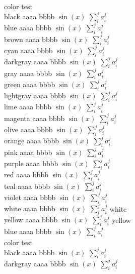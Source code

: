 \documentclass[amsfonts,aps, prl,nofootinbib, twocolumn,showpacs, showkeys,longbibliography]{revtex4-1}
\begin{document}
color test\\
{\color{black} black aaaa bbbb $\sin(x)$ $\sum_{i}^{j} a_{i}^{j}$}\\
{\color{blue} blue aaaa bbbb $\sin(x)$ $\sum_{i}^{j} a_{i}^{j}$}\\
{\color{brown} brown aaaa bbbb $\sin(x)$ $\sum_{i}^{j} a_{i}^{j}$}\\
{\color{cyan} cyan aaaa bbbb $\sin(x)$ $\sum_{i}^{j} a_{i}^{j}$}\\
{\color{darkgray} darkgray aaaa bbbb $\sin(x)$ $\sum_{i}^{j} a_{i}^{j}$}\\
{\color{gray} gray aaaa bbbb $\sin(x)$ $\sum_{i}^{j} a_{i}^{j}$}\\
{\color{green} green aaaa bbbb $\sin(x)$ $\sum_{i}^{j} a_{i}^{j}$}\\
{\color{lightgray} lightgray aaaa bbbb $\sin(x)$ $\sum_{i}^{j} a_{i}^{j}$}\\
{\color{lime} lime aaaa bbbb $\sin(x)$ $\sum_{i}^{j} a_{i}^{j}$}\\
{\color{magenta} magenta aaaa bbbb $\sin(x)$ $\sum_{i}^{j} a_{i}^{j}$}\\
{\color{olive} olive aaaa bbbb $\sin(x)$ $\sum_{i}^{j} a_{i}^{j}$}\\
{\color{orange} orange aaaa bbbb $\sin(x)$ $\sum_{i}^{j} a_{i}^{j}$}\\
{\color{pink} pink aaaa bbbb $\sin(x)$ $\sum_{i}^{j} a_{i}^{j}$}\\
{\color{purple} purple aaaa bbbb $\sin(x)$ $\sum_{i}^{j} a_{i}^{j}$}\\
{\color{red} red aaaa bbbb $\sin(x)$ $\sum_{i}^{j} a_{i}^{j}$}\\
{\color{teal} teal aaaa bbbb $\sin(x)$ $\sum_{i}^{j} a_{i}^{j}$}\\
{\color{violet} violet aaaa bbbb $\sin(x)$ $\sum_{i}^{j} a_{i}^{j}$}\\
{\color{white} white aaaa bbbb $\sin(x)$ $\sum_{i}^{j} a_{i}^{j}$} white\\
{\color{yellow} yellow aaaa bbbb $\sin(x)$ $\sum_{i}^{j} a_{i}^{j}$} yellow\\
{\color{blue} blue aaaa bbbb $\sin(x)$ $\sum_{i}^{j} a_{i}^{j}$}\\

color test\\
{\color{black} black aaaa bbbb $\sin(x)$ $\sum_{i}^{j} a_{i}^{j}$}\\
{\color{darkgray} darkgray aaaa bbbb $\sin(x)$ $\sum_{i}^{j} a_{i}^{j}$}\\
\end{document}
